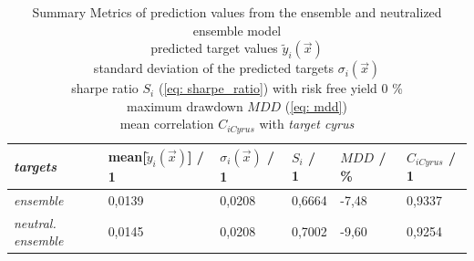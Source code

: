 \documentclass[12pt, a4paper]{article}
\begin{document}
\begin{table}[!htbp]
\centering
\caption{Summary Metrics of prediction values from the ensemble and neutralized ensemble model \\
predicted target values $\tilde{y}_i(\vec{x})$ \\
standard deviation of the predicted targets $\sigma_i(\vec{x})$ \\
sharpe ratio $S_i$ (\ref{eq: sharpe_ratio}) with risk free yield 0 \% \\
maximum drawdown $MDD$ (\ref{eq: mdd}) \\
mean correlation $C_{iCyrus}$ with \textit{target cyrus} \\}
\label{table: summary_metric_predictions_neutral_ensemble}
\begin{tabular}{|l|l|l|l|l|l|}
\hline
\textit{targets} & mean[$\tilde{y}_i(\vec{x})$] / 1 & $\sigma_i(\vec{x})$ / 1 & $S_i$ / 1 & $MDD$ / \% & $C_{iCyrus}$ / 1 \\ \hline
\hline
\hline
\textit{ensemble} & 0,0139 & 0,0208 & 0,6664 & -7,48 & 0,9337 \\ \hline
\hline
\textit{neutral. ensemble} & 0,0145 & 0,0208 & 0,7002 & -9,60 & 0,9254 \\ \hline
\end{tabular}
\end{table}
\newpage
\end{document}
